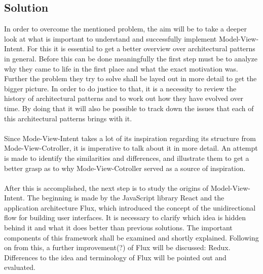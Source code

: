 \subsection{Solution}
\label{subsec:solution}


In order to overcome the mentioned problem, the aim will be to take a deeper look at what is important to understand and successfully implement Model-View-Intent.
For this it is essential to get a better overview over architectural patterns in general. Before this can be done meaningfully the first step must be 
to analyze why they came to life in the first place and what the exact motivation was. Further the problem they try to solve shall be layed out in more detail to 
get the bigger picture. In order to do justice to that, it is a necessity to review the history of architectural patterns and to work out how they have evolved over time.
By doing that it will also be possible to track down the issues that each of this architectural patterns brings with it.
\\
\\
Since Mode-View-Intent takes a lot of its inspiration regarding its structure from Mode-View-Cotroller, it is imperative to talk about it in more detail.
An attempt is made to identify the similarities and differences, and illustrate them to get a better grasp as to why Mode-View-Cotroller served as a source of inspiration.
\\
\\
After this is accomplished, the next step is to study the origins of Model-View-Intent. The beginning is made by the JavaScript library React and the application architecture
Flux, which introduced the concept of the unidirectional flow for building user interfaces. It is necessary to clarify which idea is hidden behind it and what it does
better than previous solutions. The important components of this framework shall be examined and shortly explained. Following on from this, a further improvement(?) of Flux will 
be discussed: Redux. Differences to the idea and terminology of Flux will be pointed out and evaluated.

